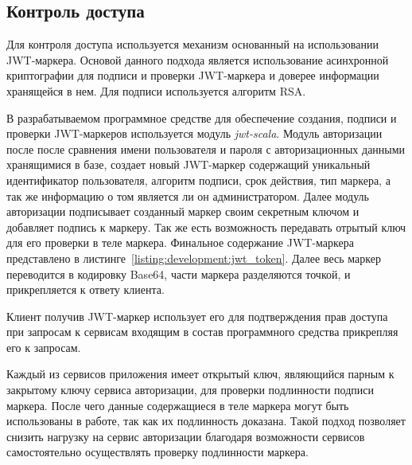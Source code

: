 



\subsection{Контроль доступа}
\label{sec:development:access_control}
Для контроля доступа используется механизм основанный на использовании JWT-маркера. Основой данного подхода является использование асинхронной криптографии для подписи и проверки JWT-маркера и доверее информации хранящейся в нем. Для подписи используется алгоритм RSA.

В разрабатываемом программное средстве для обеспечение создания, подписи и проверки JWT-маркеров используется модуль \emph{jwt-scala}. Модуль авторизации после после сравнения имени пользователя и пароля с авторизационных данными хранящимися в базе, создает новый JWT-маркер содержащий уникальный идентификатор пользователя, алгоритм подписи, срок действия, тип маркера, а так же информацию о том является ли он администратором. Далее модуль авторизации подписывает созданный маркер своим секретным ключом и добавляет подпись к маркеру. Так же есть возможность передавать отрытый ключ для его проверки в теле маркера.
Финальное содержание JWT-маркера представлено в листинге~\ref{listing:development:jwt_token}. Далее весь маркер переводится в кодировку Base64, части маркера разделяются точкой, и прикрепляется к ответу клиента.


Клиент получив JWT-маркер использует его для подтверждения прав доступа при запросам к сервисам входящим в состав программного средства прикрепляя его к запросам.

Каждый из сервисов приложения имеет открытый ключ, являющийся парным к закрытому ключу сервиса авторизации, для проверки подлинности подписи маркера. После чего данные содержащиеся в теле маркера могут быть использованы в работе, так как их подлинность доказана. Такой подход позволяет снизить нагрузку на сервис авторизации благодаря возможности сервисов самостоятельно осуществлять проверку подлинности маркера.


